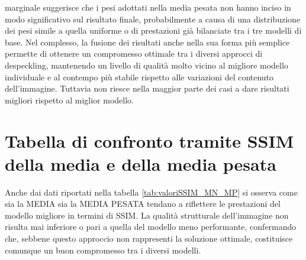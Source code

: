 marginale suggerisce che i pesi adottati nella media pesata non hanno inciso in modo significativo sul risultato finale, probabilmente a 
causa di una distribuzione dei pesi simile a quella uniforme o di prestazioni già bilanciate tra i tre modelli di base.
Nel complesso, la fusione dei risultati anche nella sua forma più semplice permette di ottenere un compromesso ottimale tra i diversi 
approcci di despeckling, mantenendo un livello di qualità molto vicino al migliore modello individuale e al contempo più 
stabile rispetto alle variazioni del contenuto dell’immagine. Tuttavia non riesce nella maggior parte dei casi a dare 
risultati migliori rispetto al miglior modello.

\section{Tabella di confronto tramite SSIM della media e della media pesata}
\begin{table}[H] %
    \centering
    \caption{Confronto dei modelli di despeckling e della loro fusione. 
              I valori sopra, indicano la media del SSIM di 100 immagini rappresentanti diversi biomi.
              Ogni modello per la previsione della qualità, usato in MEDIA PESATA, 
              è stato allenato per 10 epoche con un dataset da 30'000 
              immagini. }
    \label{tab:valoriSSIM_MN_MP}
  \end{table}  
  Anche dai dati riportati nella tabella \ref{tab:valoriSSIM_MN_MP} si osserva come sia la MEDIA sia la MEDIA PESATA 
  tendano a riflettere le prestazioni del modello migliore in termini di SSIM. La qualità strutturale dell’immagine 
  non risulta mai inferiore o pari a quella del modello meno performante, confermando che, sebbene questo 
  approccio non rappresenti la soluzione ottimale, costituisce comunque un buon compromesso tra i diversi modelli.
